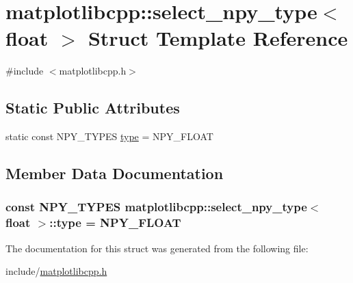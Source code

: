 \hypertarget{structmatplotlibcpp_1_1select__npy__type_3_01float_01_4}{}\section{matplotlibcpp\+:\+:select\+\_\+npy\+\_\+type$<$ float $>$ Struct Template Reference}
\label{structmatplotlibcpp_1_1select__npy__type_3_01float_01_4}


{\ttfamily \#include $<$matplotlibcpp.\+h$>$}

\subsection*{Static Public Attributes}
\begin{DoxyCompactItemize}
\item 
static const N\+P\+Y\+\_\+\+T\+Y\+P\+ES \hyperlink{structmatplotlibcpp_1_1select__npy__type_3_01float_01_4_a7bca025a3f0cb143e566e0f575bf7f6b}{type} = N\+P\+Y\+\_\+\+F\+L\+O\+AT
\end{DoxyCompactItemize}


\subsection{Member Data Documentation}
\subsubsection[{\texorpdfstring{type}{type}}]{\setlength{\rightskip}{0pt plus 5cm}const N\+P\+Y\+\_\+\+T\+Y\+P\+ES {\bf matplotlibcpp\+::select\+\_\+npy\+\_\+type}$<$ float $>$\+::type = N\+P\+Y\+\_\+\+F\+L\+O\+AT\hspace{0.3cm}{\ttfamily [static]}}\hypertarget{structmatplotlibcpp_1_1select__npy__type_3_01float_01_4_a7bca025a3f0cb143e566e0f575bf7f6b}{}\label{structmatplotlibcpp_1_1select__npy__type_3_01float_01_4_a7bca025a3f0cb143e566e0f575bf7f6b}


The documentation for this struct was generated from the following file\+:\begin{DoxyCompactItemize}
\item 
include/\hyperlink{matplotlibcpp_8h}{matplotlibcpp.\+h}\end{DoxyCompactItemize}
